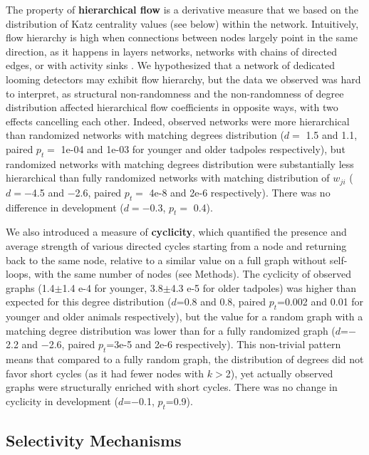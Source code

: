 \documentclass{article}
\begin{document}
The property of \textbf{hierarchical flow} is a derivative measure \citep{mones2012hierarchy} that we based on the distribution of Katz centrality values \citep{katz1953original,fletcher2018katz} (see below) within the network. Intuitively, flow hierarchy is high when connections between nodes largely point in the same direction, as it happens in layers networks, networks with chains of directed edges, or with activity sinks \citep{czegel2015hierarchy}. We hypothesized that a network of dedicated looming detectors may exhibit flow hierarchy, but the data we observed was hard to interpret, as structural non-randomness and the non-randomness of degree distribution affected hierarchical flow coefficients in opposite ways, with two effects cancelling each other. Indeed, observed networks were more hierarchical than randomized networks with matching degrees distribution ($d=$ 1.5 and 1.1, paired $p_t=$ 1e-04 and 1e-03 for younger and older tadpoles respectively), but randomized networks with matching degrees distribution were substantially less hierarchical than fully randomized networks with matching distribution of $w_{ji}$ ($d=-$4.5 and $-$2.6, paired $p_t=$ 4e-8 and 2e-6 respectively). There was no difference in development ($d=-$0.3, $p_t=$ 0.4).

We also introduced a measure of \textbf{cyclicity}, which quantified the presence and average strength of various directed cycles starting from a node and returning back to the same node, relative to a similar value on a full graph without self-loops, with the same number of nodes (see Methods). The cyclicity of observed graphs (1.4$\pm$1.4 e-4 for younger, 3.8$\pm$4.3 e-5 for older tadpoles) was higher than expected for this degree distribution ($d$=0.8 and 0.8, paired $p_t$=0.002 and 0.01 for younger and older animals respectively), but the value for a random graph with a matching degree distribution was lower than for a fully randomized graph ($d$=$-$2.2 and $-$2.6, paired $p_t$=3e-5 and 2e-6 respectively). This non-trivial pattern means that compared to a fully random graph, the distribution of degrees did not favor short cycles (as it had fewer nodes with $k>$2), yet actually observed graphs were structurally enriched with short cycles. There was no change in cyclicity in development ($d$=$-$0.1, $p_t$=0.9).

\subsection*{Selectivity Mechanisms}
\end{document}
